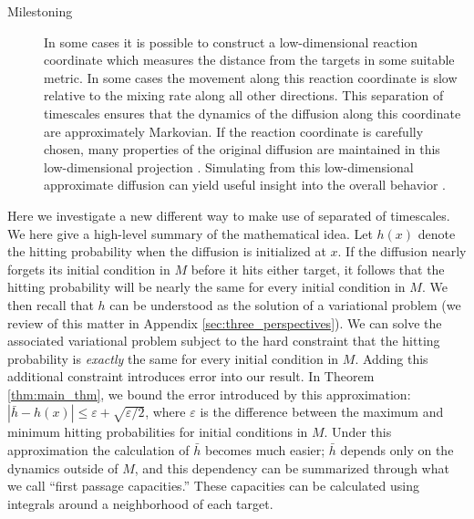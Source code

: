 \documentclass[12pt, nofootinbib,english, amsmath, amssymb, aps, priprint, graphicx,floatfix]{revtex4-1}
\theoremstyle{plain}
\theoremstyle{definition}
\theoremstyle{plain}
\begin{document}
\begin{description}
    \item[Milestoning] In some cases it is possible to construct a low-dimensional reaction coordinate which measures the distance from the targets in some suitable metric.  In some cases the movement along this reaction coordinate is slow relative to the mixing rate along all other directions.  This separation of timescales ensures that the dynamics of the diffusion along this coordinate are approximately Markovian.  If the reaction coordinate is carefully chosen, many properties of the original diffusion are maintained in this low-dimensional projection \cite{E2006-fm}.  Simulating from this low-dimensional approximate diffusion can yield useful insight into the overall behavior \cite{Bello-Rivas2015-ld}.  
\end{description}

Here we investigate a new different way to make use of separated of timescales.  We here give a high-level summary of the mathematical idea.  Let $h(x)$ denote the hitting probability when the diffusion is initialized at $x$.  If the diffusion nearly forgets its initial condition in $M$ before it hits either target, it follows that the hitting probability will be nearly the same for every initial condition in $M$.  We then recall that $h$ can be understood as the solution of a variational problem (we review of this matter in Appendix \ref{sec:three_perspectives}).  We can solve the associated variational problem subject to the hard constraint that the hitting probability is \emph{exactly} the same for every initial condition in $M$.  Adding this additional constraint introduces error into our result.  In Theorem \ref{thm:main_thm}, we bound the error introduced by this approximation: $|\bar h - h(x) |\leq \varepsilon + \sqrt{\varepsilon/2}$, where $\varepsilon$ is the difference between the maximum and minimum hitting probabilities for initial conditions in $M$.  Under this approximation the calculation of $\bar h$ becomes much easier; $\bar h$ depends only on the dynamics outside of $M$, and this dependency can be summarized through what we call ``first passage capacities.''  These capacities can be calculated using integrals around a neighborhood of each target.  
\end{document}
